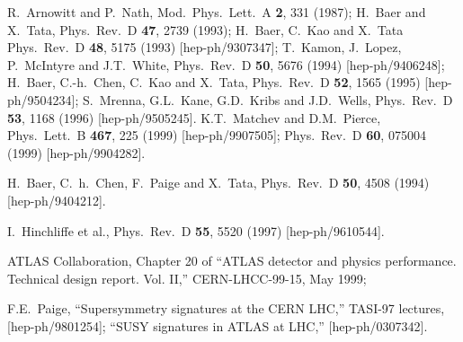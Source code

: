 \documentclass[11pt]{article}
\begin{document}
\begin{thebibliography}{999}
R.~Arnowitt and P.~Nath, 
  Mod.\ Phys.\ Lett.\ A {\bf 2}, 331 (1987);
H.~Baer and X.~Tata,
  Phys.\ Rev.\ D {\bf 47}, 2739 (1993);
H.~Baer, C.~Kao and X.~Tata
  Phys.\ Rev.\ D {\bf 48}, 5175 (1993)
  [hep-ph/9307347];
T.~Kamon, J.~Lopez, P.~McIntyre and J.T.~White, 
  Phys.\ Rev.\ D {\bf 50}, 5676 (1994)
  [hep-ph/9406248];
H.~Baer, C.-h.~Chen, C.~Kao and X.~Tata, 
  Phys.\ Rev.\ D {\bf 52}, 1565 (1995)
  [hep-ph/9504234];
S.~Mrenna, G.L.~Kane, G.D.~Kribs and J.D.~Wells,
  Phys.\ Rev.\ D {\bf 53}, 1168 (1996)
  [hep-ph/9505245].
K.T.~Matchev and D.M.~Pierce,
  Phys.\ Lett.\ B {\bf 467}, 225 (1999)
  [hep-ph/9907505];
  Phys.\ Rev.\ D {\bf 60}, 075004 (1999)
  [hep-ph/9904282].

H.~Baer, C.~h.~Chen, F.~Paige and X.~Tata,
  Phys.\ Rev.\ D {\bf 50}, 4508 (1994)
  [hep-ph/9404212].

I.~Hinchliffe et al., 
  Phys.\ Rev.\ D {\bf 55}, 5520 (1997)
  [hep-ph/9610544].

ATLAS Collaboration, 
  Chapter 20 of ``ATLAS detector and physics performance. 
  Technical design report.  Vol. II,'' CERN-LHCC-99-15, May 1999;

F.E.~Paige,
  ``Supersymmetry signatures at the CERN LHC,'' TASI-97 lectures,
  [hep-ph/9801254];
  ``SUSY signatures in ATLAS at LHC,''
  [hep-ph/0307342].


\end{thebibliography}
\end{document}
